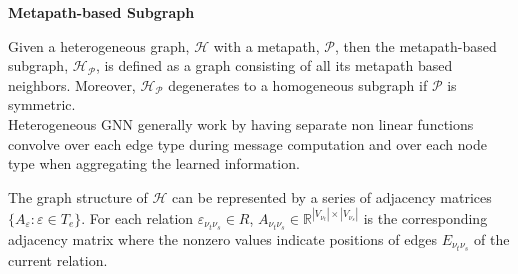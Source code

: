 \documentclass{report} %
\begin{document}
\textbf{Metapath-based Subgraph}

Given a heterogeneous graph, $\mathcal{H}$ with a metapath, $\mathcal{P}$, then the metapath-based subgraph, $\mathcal{H_P}$, is defined as a graph consisting of all 
its metapath based neighbors. Moreover, $\mathcal{H_P}$ degenerates to a homogeneous subgraph if $\mathcal{P}$ is symmetric.\\

Heterogeneous \ac{GNN} generally work by having separate non linear functions convolve over each edge type during message computation and over each node type when 
aggregating the learned information. 

The graph structure of $\mathcal{H}$  can be represented by a series of adjacency matrices \(\{A_\varepsilon : \varepsilon \in T_e\}\). 
For each relation \(\varepsilon_{\nu_t \nu_s} \in R\), \(A_{\nu_t \nu_s} \in \mathbb{R}^{|V_{\nu_t}| \times |V_{\nu_s}|}\) is the corresponding 
adjacency matrix where the nonzero values indicate positions of edges \(E_{\nu_t \nu_s}\) of the current relation.\\
\end{document}
